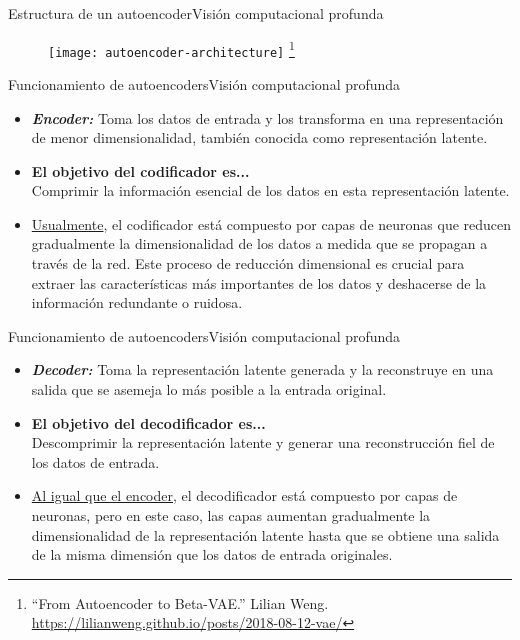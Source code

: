 \documentclass[10pt,border=3pt,tikz]{beamer}
\begin{document}
    \begin{frame}{Estructura de un autoencoder}{Visión computacional profunda}
        \begin{figure}
            \centering
            \texttt{[image: autoencoder-architecture]}
            \let\thefootnote\relax\footnote{{\tiny “From Autoencoder to Beta-VAE.” Lilian Weng. \url{https://lilianweng.github.io/posts/2018-08-12-vae/}}}
        \end{figure}
    \end{frame}
    
    \begin{frame}{Funcionamiento de autoencoders}{Visión computacional profunda}
        \begin{itemize}
            \item \textit{\textbf{Encoder:}} Toma los datos de entrada y los transforma en una representación de menor dimensionalidad, también conocida como representación latente. 
            \item \textbf{El objetivo del codificador es...} \\
            Comprimir la información esencial de los datos en esta representación latente. 
            \item \underline{Usualmente}, el codificador está compuesto por capas de neuronas que reducen gradualmente la dimensionalidad de los datos a medida que se propagan a través de la red. Este proceso de reducción dimensional es crucial para extraer las características más importantes de los datos y deshacerse de la información redundante o ruidosa.
        \end{itemize}
    \end{frame}
    
    \begin{frame}{Funcionamiento de autoencoders}{Visión computacional profunda}
        \begin{itemize}
            \item \textit{\textbf{Decoder:}} Toma la representación latente generada y la reconstruye en una salida que se asemeja lo más posible a la entrada original. 
            \item \textbf{El objetivo del decodificador es...}\\ 
            Descomprimir la representación latente y generar una reconstrucción fiel de los datos de entrada.
            \item \underline{Al igual que el encoder}, el decodificador está compuesto por capas de neuronas, pero en este caso, las capas aumentan gradualmente la dimensionalidad de la representación latente hasta que se obtiene una salida de la misma dimensión que los datos de entrada originales.
        \end{itemize}
    \end{frame}
    
\end{document}
